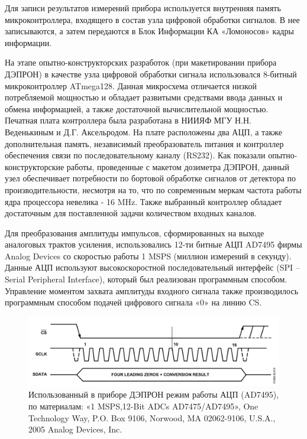 Для записи результатов измерений прибора используется внутренняя память микроконтроллера, входящего в состав узла цифровой обработки сигналов. В нее записываются, а затем передаются в Блок Информации КА «Ломоносов» кадры информации.

На этапе опытно-конструкторских разработок (при макетировании прибора ДЭПРОН) в качестве узла цифровой обработки сигнала использовался 8-битный микроконтроллер ATmega128. Данная микросхема отличается низкой потребляемой мощностью и обладает развитыми средствами ввода данных и обмена информацией, а также достаточной вычислительной мощностью. Печатная плата контроллера была разработана в  НИИЯФ МГУ Н.Н. Веденькиным и Д.Г. Аксельродом. На плате расположены два АЦП, а также дополнительная память, независимый преобразователь питания и контроллер обеспечения связи по последовательному каналу (RS232). Как показали опытно-конструкторские работы, проведенные с макетом дозиметра ДЭПРОН, данный узел обеспечивает потребности по бортовой обработке сигналов от детектора по производительности, несмотря на то, что по современным меркам частота работы ядра процессора невелика - 16 MHz. Также выбранный контроллер обладает достаточным для поставленной задачи количеством входных каналов.

Для преобразования амплитуды импульсов, сформированных на выходе аналоговых трактов усиления, использовались 12-ти битные АЦП AD7495 фирмы Analog Devices со скоростью работы 1 MSPS (миллион измерений в секунду). Данные АЦП используют высокоскоростной последовательный интерфейс (SPI -- Serial Peripheral Interface), который был реализован программным способом. Управление моментом захвата амплитуды входного сигнала также производилось программным способом подачей цифрового сигнала «0» на линию CS. 
\begin{figure}
	\centering
	\includegraphics[width=0.7\linewidth]{images/adc}
	\caption{Использованный в приборе ДЭПРОН режим работы АЦП (AD7495), по материалам:  «1 MSPS,12-Bit ADCs  AD7475/AD7495», One Technology Way, P.O. Box 9106, Norwood, MA 02062-9106, U.S.A., 2005 Analog Devices, Inc.}
	\label{fig:adc}
\end{figure}

